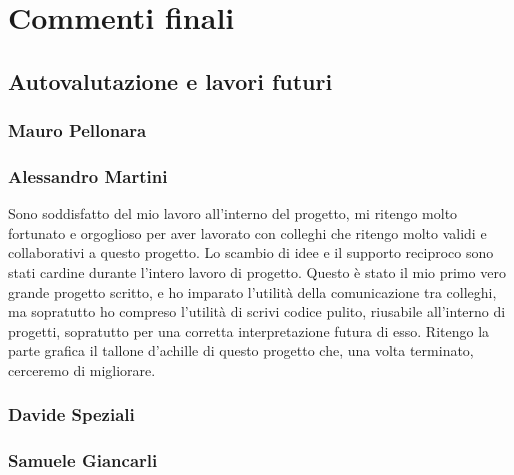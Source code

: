 \section{Commenti finali}
\subsection{Autovalutazione e lavori futuri}
\subsubsection*{Mauro Pellonara} 

\subsubsection*{Alessandro Martini}
Sono soddisfatto del mio lavoro all'interno del progetto, mi ritengo molto fortunato e orgoglioso per aver lavorato con colleghi che ritengo molto validi e collaborativi a questo progetto.
Lo scambio di idee e il supporto reciproco sono stati cardine durante l'intero lavoro di progetto. Questo è stato il mio primo vero grande progetto scritto, e ho imparato l'utilità della comunicazione tra colleghi, ma sopratutto ho compreso l'utilità di scrivi codice pulito, riusabile all'interno di progetti, sopratutto per una corretta interpretazione futura di esso. Ritengo la parte grafica il tallone d'achille di questo progetto che, una volta terminato, cerceremo di migliorare.
\subsubsection*{Davide Speziali}

\subsubsection*{Samuele Giancarli}
